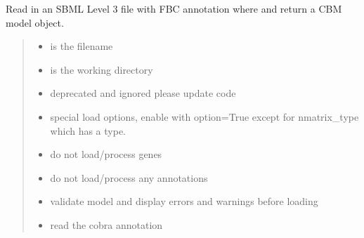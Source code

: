 \documentclass[letterpaper,12pt,english]{sphinxmanual}
\begin{document}
\begin{fulllineitems}

\pysigstartsignatures
\pysiglinewithargsret
{}
{\sphinxparamcomma {}\sphinxparamcomma {}\sphinxparamcomma {}\sphinxparamcomma {}}
{}
\pysigstopsignatures
\sphinxAtStartPar
Read in an SBML Level 3 file with FBC annotation where and return a CBM model object.
\begin{quote}\begin{description}
\begin{itemize}
\item {} 
\sphinxAtStartPar
{} \textendash{} is the filename

\item {} 
\sphinxAtStartPar
{} \textendash{} is the working directory

\item {} 
\sphinxAtStartPar
{} \textendash{} deprecated and ignored please update code

\item {} 
\sphinxAtStartPar
{} \textendash{} special load options, enable with option=True except for nmatrix\_type which has a type.

\item {} 
\sphinxAtStartPar
{} \textendash{} do not load/process genes

\item {} 
\sphinxAtStartPar
{} \textendash{} do not load/process any annotations

\item {} 
\sphinxAtStartPar
{} \textendash{} validate model and display errors and warnings before loading

\item {} 
\sphinxAtStartPar
{} \textendash{} read the cobra annotation


\end{itemize}
\end{description}
\end{quote}
\end{fulllineitems}
\end{document}
